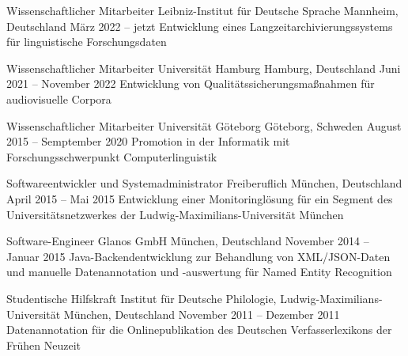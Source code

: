 \documentclass[11pt, a4]{academic-cv}
\begin{document}
\begin{cventries}
\cventry
{Wissenschaftlicher Mitarbeiter} %
{ Leibniz-Institut für Deutsche Sprache} %
{Mannheim, Deutschland} %
{März 2022 -- jetzt} %
{
Entwicklung eines Langzeitarchivierungssystems für linguistische Forschungsdaten
}

\cventry
{Wissenschaftlicher Mitarbeiter} %
{ Universität Hamburg} %
{Hamburg, Deutschland} %
{Juni 2021 -- November 2022} %
{
Entwicklung von Qualitätssicherungsmaßnahmen für audiovisuelle Corpora
}

\cventry
{Wissenschaftlicher Mitarbeiter} %
{ Universität Göteborg} %
{Göteborg, Schweden} %
{August 2015 -- Semptember 2020} %
{
Promotion in der Informatik mit Forschungsschwerpunkt Computerlinguistik
}

\cventry
{Softwareentwickler und Systemadministrator} %
{Freiberuflich} %
{München, Deutschland} %
{April 2015 -- Mai 2015} %
{
Entwicklung einer Monitoringlösung für ein Segment des Universitätsnetzwerkes der Ludwig-Maximilians-Universität München
}

\cventry
{Software-Engineer} %
{ Glanos GmbH} %
{München, Deutschland} %
{November 2014 -- Januar 2015} %
{
Java-Backendentwicklung zur Behandlung von XML/JSON-Daten und manuelle Datenannotation und -auswertung für Named Entity Recognition
}

\cventry
{Studentische Hilfskraft} %
{ Institut für Deutsche Philologie, Ludwig-Maximilians-Universität} %
{München, Deutschland} %
{November 2011 -- Dezember 2011} %
{
Datenannotation für die Onlinepublikation des Deutschen Verfasserlexikons der Frühen Neuzeit
}


\end{cventries}
\end{document}

